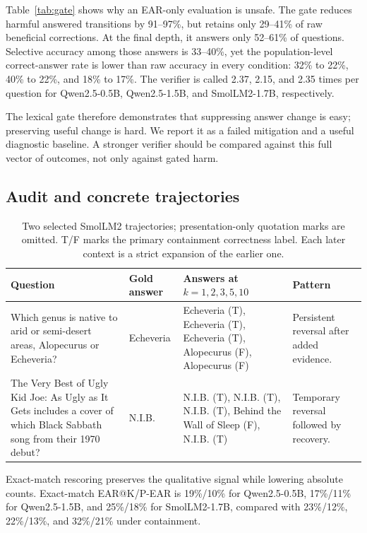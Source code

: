 \documentclass[10pt,twocolumn]{article}
\newcommand{\qsmall}{Qwen2.5-0.5B}
\newcommand{\qlarge}{Qwen2.5-1.5B}
\newcommand{\smol}{SmolLM2-1.7B}
\begin{document}
Table~\ref{tab:gate} shows why an EAR-only evaluation is unsafe. The gate reduces harmful answered transitions by 91--97\%, but retains only 29--41\% of raw beneficial corrections. At the final depth, it answers only 52--61\% of questions. Selective accuracy among those answers is 33--40\%, yet the population-level correct-answer rate is lower than raw accuracy in every condition: 32\% to 22\%, 40\% to 22\%, and 18\% to 17\%. The verifier is called 2.37, 2.15, and 2.35 times per question for \qsmall{}, \qlarge{}, and \smol{}, respectively.

The lexical gate therefore demonstrates that suppressing answer change is easy; preserving useful change is hard. We report it as a failed mitigation and a useful diagnostic baseline. A stronger verifier should be compared against this full vector of outcomes, not only against gated harm.

\subsection{Audit and concrete trajectories}
\label{sec:audit}

\begin{table}[t]
\centering
\caption{Two selected SmolLM2 trajectories; presentation-only quotation marks are omitted. T/F marks the primary containment correctness label. Each later context is a strict expansion of the earlier one.}
\label{tab:examples}
\small
\begin{tabular}{@{}p{}p{}p{}p{}@{}}
\toprule
Question & Gold answer & Answers at $k=1,2,3,5,10$ & Pattern \\
\midrule
Which genus is native to arid or semi-desert areas, Alopecurus or Echeveria? & Echeveria & Echeveria (T), Echeveria (T), Echeveria (T), Alopecurus (F), Alopecurus (F) & Persistent reversal after added evidence. \\
\addlinespace
The Very Best of Ugly Kid Joe: As Ugly as It Gets includes a cover of which Black Sabbath song from their 1970 debut? & N.I.B. & N.I.B. (T), N.I.B. (T), N.I.B. (T), Behind the Wall of Sleep (F), N.I.B. (T) & Temporary reversal followed by recovery. \\
\bottomrule
\end{tabular}
\end{table}

Exact-match rescoring preserves the qualitative signal while lowering absolute counts. Exact-match EAR@K/P-EAR is 19\%/10\% for \qsmall{}, 17\%/11\% for \qlarge{}, and 25\%/18\% for \smol{}, compared with 23\%/12\%, 22\%/13\%, and 32\%/21\% under containment.
\end{document}
